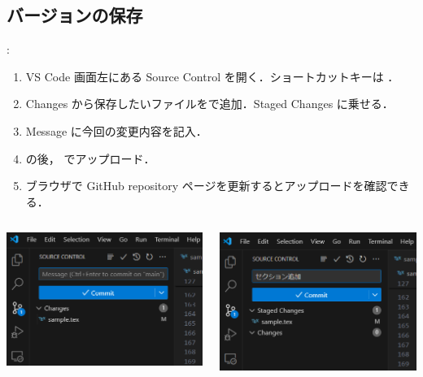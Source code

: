 \documentclass[aspectratio=169,dvipdfmx,cjk]{beamer}
\begin{document}
\subsection{バージョンの保存}
\begin{frame}[label=git]{\insertsection \thesubsection: \insertsubsection}
  \begin{enumerate}
    \item VS Code 画面左にある Source Control を開く．ショートカットキーは ．
    \item Changes から保存したいファイルを\beamerbutton{+}で追加．Staged Changes に乗せる．
    \item Message に今回の変更内容を記入．
    \item {} の後， でアップロード．
    \item ブラウザで GitHub repository ページを更新するとアップロードを確認できる．
  \end{enumerate}
  \begin{columns}
    \begin{column}{0.3\textwidth}
        \includegraphics[width=1.0\linewidth]{fig/git-control.png}
    \end{column}
    \begin{column}{0.3\textwidth}
      \includegraphics[width=1.0\linewidth]{fig/git-commit.png}

\end{column}
\end{columns}
\end{frame}
\end{document}
